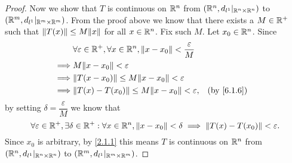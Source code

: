 \begin{proof}
  Now we show that \(T\) is continuous on \(\R^n\) from \((\R^n, d_{l^1}|_{\R^n \times \R^n})\) to \((\R^m, d_{l^1}|_{\R^m \times \R^m})\).
  From the proof above we know that there exists a \(M \in \R^+\) such that \(\norm*{T(x)} \leq M \norm*{x}\) for all \(x \in \R^n\).
  Fix such \(M\).
  Let \(x_0 \in \R^n\).
  Since
  \begin{align*}
             & \forall \varepsilon \in \R^+, \forall x \in \R^n, \norm*{x - x_0} < \dfrac{\varepsilon}{M}                 \\
    \implies & M \norm*{x - x_0} < \varepsilon                                                                            \\
    \implies & \norm*{T(x - x_0)} \leq M \norm*{x - x_0} < \varepsilon                                                    \\
    \implies & \norm*{T(x) - T(x_0)} \leq M \norm*{x - x_0} < \varepsilon,                                &  & \by{6.1.6}
  \end{align*}
  by setting \(\delta = \dfrac{\varepsilon}{M}\) we know that
  \[
    \forall \varepsilon \in \R^+, \exists \delta \in \R^+ : \forall x \in \R^n, \norm*{x - x_0} < \delta \implies \norm*{T(x) - T(x_0)} < \varepsilon.
  \]
  Since \(x_0\) is arbitrary, by \cref{2.1.1} this means \(T\) is continuous on \(\R^n\) from \((\R^n, d_{l^1}|_{\R^n \times \R^n})\) to \((\R^m, d_{l^1}|_{\R^m \times \R^m})\).
\end{proof}
